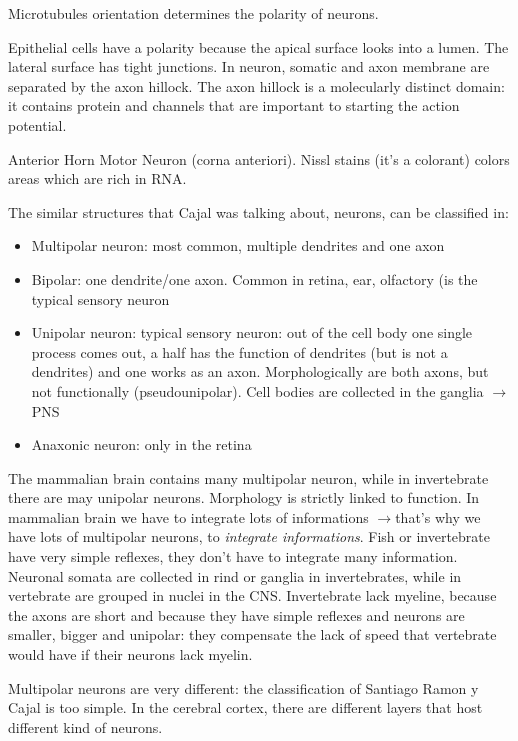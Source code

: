 \documentclass[a4paper, 12pt]{book}
\newcommand{\lfreccia}{\ensuremath{\longrightarrow}}
\begin{document}
Microtubules orientation determines the polarity of neurons.

Epithelial cells have a polarity because the apical surface looks into a lumen. The lateral surface has tight junctions. In neuron, somatic and axon membrane are separated by the axon hillock. The axon hillock is a molecularly distinct domain: it contains protein and channels that are important to starting the action potential.


Anterior Horn Motor Neuron (corna anteriori). Nissl stains (it's a colorant) colors areas which are rich in RNA.

The similar structures that Cajal was talking about, neurons, can be classified in:
\begin{itemize}
\item{Multipolar neuron: most common, multiple dendrites and one axon}
\item{Bipolar: one dendrite/one axon. Common in retina, ear, olfactory (is the typical sensory neuron}
\item{Unipolar neuron: typical sensory neuron: out of the cell body one single process comes out, a half has the function of dendrites (but is not a dendrites) and one works as an axon. Morphologically are both axons, but not functionally (pseudounipolar). Cell bodies are collected in the ganglia \lfreccia PNS}
\item{Anaxonic neuron: only in the retina}
\end{itemize}

The mammalian brain contains many multipolar neuron, while in invertebrate there are may unipolar neurons. Morphology is strictly linked to function. In mammalian brain we have to integrate lots of informations \lfreccia that's why we have lots of multipolar neurons, to \emph{integrate informations}. Fish or invertebrate have very simple reflexes, they don't have to integrate many information. Neuronal somata are collected in rind or ganglia in invertebrates, while in vertebrate are grouped in nuclei in the CNS. Invertebrate lack myeline, because the axons are short and because they have simple reflexes and neurons are smaller, bigger and unipolar: they compensate the lack of speed that vertebrate would have if their neurons lack myelin.

Multipolar neurons are very different: the classification of Santiago Ramon y Cajal is too simple. In the cerebral cortex, there are different layers that host different kind of neurons.
\end{document}
